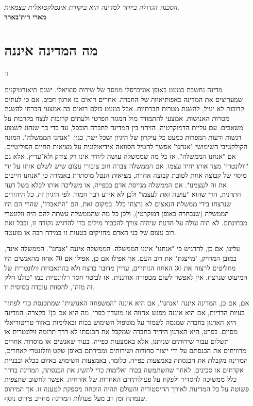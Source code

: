 \documentclass[12pt,oneside]{book}
\newcommand{\emptypage}{
  \newpage
  \thispagestyle{empty}
  \vspace*{\fill}
  \vspace*{\fill}
  \newpage
}
\newcommand{\hebrewchapter}[2]{%
  \chapter*{#1}%
  \addcontentsline{toc}{chapter}{#1}%
  \lettrine[lines=4, lhang=0.1, loversize=0.5, findent=0pt]{\textcolor{gray} #2}{}%
}
\begin{document}
\emptypage

\thispagestyle{empty}
\begin{center}
\vspace*{5cm}
\textit{הסכנה הגדולה ביותר למדינה היא ביקורת אינטלקטואלית עצמאית.} \\
\vspace{1em}
\textbf{מארי רות'בארד}
\end{center}
\newpage


\emptypage

\tableofcontents
\newpage

\hebrewchapter{מה המדינה איננה}{ה}
מדינה נחשבת כמעט באופן אוניברסלי ממסד של שירות סוציאלי.
ישנם תיאורטיקנים שמעריצים את המדינה כאפותיאוזה של החברה.
אחרים רואים בו ארגון חביב, אם כי לעתים קרובות לא יעיל, להשגת מטרות חברתיות.
אבל כמעט כולם רואים בה אמצעי הכרחי להשגת מטרות האנושות, אמצעי להתמודד מול המגזר הפרטי ולעתים קרובות לנצח בקרבות על משאבים.
עם עליית הדמוקרטיה, הזיהוי בין המדינה לחברה הוכפל, עד כדי כך שנהוג לשמוע רגשות ודעות המפרות כמעט כל עיקרון של היגיון ושכל ישר, כגון: "אנחנו הממשלה".
המונח הקולקטיבי השימושי "אנחנו" אפשר להטיל הסוואה אידיאולוגית על מציאות החיים הפוליטיים.
אם "אנחנו הממשלה", אז כל מה שממשלה עושה ליחיד אינו רק צודק ולא־עריץ, אלא גם "וולונטרי" מצד אותו יחיד עצמו.
אם הממשלה צברה חוב ציבורי עצום שיש לשלם אותו על ידי מיסוי של קבוצה אחת לטובת קבוצה אחרת, מציאות הנטל מוסתרת באמירה כי "אנחנו חייבים את זה לעצמנו".
אם הממשלה מגייסת אדם בכפייה, או משליכה אותו לכלא בשל דעה חתרנית, הרי שהוא "עושה זאת לעצמו" ולכן לא אירע דבר חמור.
לפי היגיון זה, כל היהודים שנרצחו בידי ממשלת הנאצים לא נרצחו כלל.
במקום זאת, הם "התאבדו", שהרי הם היו הממשלה (שנבחרה באופן דמוקרטי), ולכן כל מה שהממשלה עשתה להם היה וולונטרי מבחינתם.
לא היה עולה על הדעת שיהיה צורך להכביר מילים כדי להדגיש נקודה זו, ובכל זאת רוב עצום של בני האדם מחזיקים בטעות זו במידה רבה או מועטה.

עלינו, אם כן, להדגיש כי "אנחנו" איננו הממשלה.
הממשלה איננה "אנחנו". הממשלה אינה, במובן המדויק, "מייצגת" את רוב העם.
אך אפילו אם כן, אפילו אם 70 אחוז מהאנשים היו מחליטים לרצוח את 30 האחוז הנותרים, עדיין מדובר ברצח ולא בהתאבדות וולונטרית של המיעוט שנרצח.
אין לאפשר לשום מטפורה אורגנית, או לביטוי חסר רלוונטיות כמו "כולנו חלק זה מזה", להסוות עובדה בסיסית זו.

אם, אם כן, המדינה איננה "אנחנו", אם היא איננה "המשפחה האנושית" שמתכנסת כדי לפתור בעיות הדדיות, אם היא איננה מפגש אחווה או מועדון כפרי, מה היא אם כן?
בקצרה, המדינה היא הארגון בחברה שמנסה לשמור על מונופול השימוש בכוח ובאלימות באזור טריטוריאלי מסוים.
בפרט, היא הארגון היחיד בחברה שמקבל את הכנסתו לא דרך תרומה וולונטרית או תשלום עבור שירותים שניתנו, אלא באמצעות כפייה.
בעוד שאנשים או מוסדות אחרים מרוויחים את הכנסתם על ידי ייצור סחורות ושירותים ומכירתם באופן שקט ווולונטרי לאחרים, המדינה מקבלת את הכנסתה באמצעות כפייה.
כלומר, באמצעות השימוש באיום בכלא ובבניית אקדחים או סכינים.
לאחר שהשתמשה בכוח ואלימות כדי להשיג את הכנסתה, המדינה בדרך כלל ממשיכה להסדיר ולפקח על פעולותיהם האחרות של אזרחיה.
אפשר לחשוב שתצפית פשוטה על כל המדינות לאורך ההיסטוריה והעולם תהיה הוכחה מספקת לטענה זו. אך המיתוס שנמתח זמן רב מעל פעולות המדינה מחייב פירוט נוסף.
\end{document}
